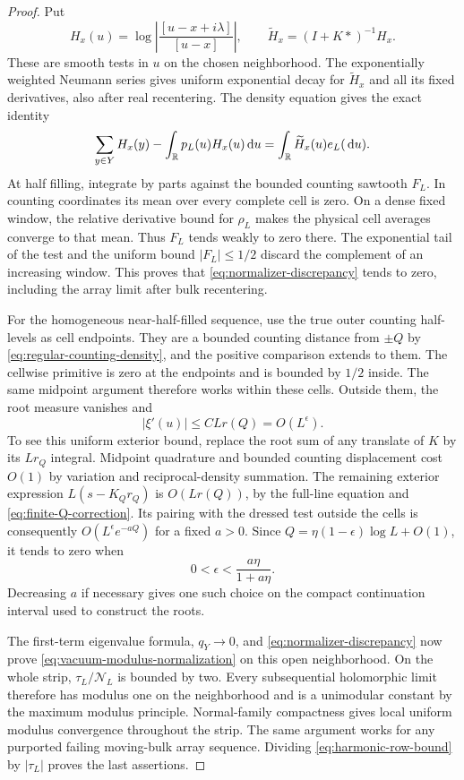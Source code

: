 \begin{proof}
Put
\[
 H_x(u)=\log\left|\frac{[u-x+i\lambda]}{[u-x]}\right|,
 \qquad
 \widetilde H_x=(I+K*)^{-1}H_x.
\]
These are smooth tests in $u$ on the chosen neighborhood.
The exponentially weighted Neumann series gives uniform exponential
decay for $\widetilde H_x$ and all its fixed derivatives, also
after real recentering.  The density equation gives the exact
identity
\begin{equation}\label{eq:normalizer-discrepancy}
 \sum_{y\in Y}H_x(y)-\int_\mathbb R p_L(u)H_x(u)\,\mathrm d u
       =\int_\mathbb R\widetilde H_x(u)e_L(\,\mathrm d u).
\end{equation}
At half filling, integrate by parts against the bounded counting
sawtooth $F_L$.  In counting coordinates its mean over every
complete cell is zero.  On a dense fixed window, the relative
derivative bound for $\rho_L$ makes the physical cell averages
converge to that mean.  Thus $F_L$ tends weakly to zero there.
The exponential tail of the test and the uniform bound $|F_L|\le1/2$
discard the complement of an increasing window.  This proves
that \eqref{eq:normalizer-discrepancy} tends to zero, including
the array limit after bulk recentering.

For the homogeneous near-half-filled sequence, use the true
outer counting half-levels as cell endpoints.  They are a bounded
counting distance from $\pm Q$ by
\eqref{eq:regular-counting-density}, and the positive comparison
extends to them.  The cellwise primitive is zero at the endpoints
and is bounded by $1/2$ inside.  The same midpoint argument
therefore works within these cells.
Outside them, the root measure vanishes and
\[
 |\xi'(u)|\le C Lr(Q)=O(L^\epsilon).
\]
To see this uniform exterior bound, replace the root sum of any
translate of $K$ by its $Lr_Q$ integral.  Midpoint quadrature and
bounded counting displacement cost $O(1)$ by variation and
reciprocal-density summation.  The remaining exterior expression
$L(s-K_Qr_Q)$ is $O(Lr(Q))$, by the full-line equation and
\eqref{eq:finite-Q-correction}.  Its pairing with the dressed
test outside the cells is consequently
$O(L^\epsilon e^{-aQ})$ for a fixed $a>0$.
Since $Q=\eta(1-\epsilon)\log L+O(1)$, it tends to zero when
\begin{equation}\label{eq:epsilon-choice}
 0<\epsilon<\frac{a\eta}{1+a\eta}.
\end{equation}
Decreasing $a$ if necessary gives one such choice on the compact
continuation interval used to construct the roots.

The first-term eigenvalue formula, $q_Y\to0$, and
\eqref{eq:normalizer-discrepancy} now prove
\eqref{eq:vacuum-modulus-normalization} on this open neighborhood.
On the whole strip, $\tau_L/\mathcal N_L$ is bounded by two.
Every subsequential holomorphic limit therefore has modulus one
on the neighborhood and is a unimodular constant by the maximum
modulus principle.  Normal-family compactness gives local uniform
modulus convergence throughout the strip.  The same argument
works for any purported failing moving-bulk array sequence.
Dividing \eqref{eq:harmonic-row-bound} by $|\tau_L|$ proves the
last assertions.
\end{proof}

